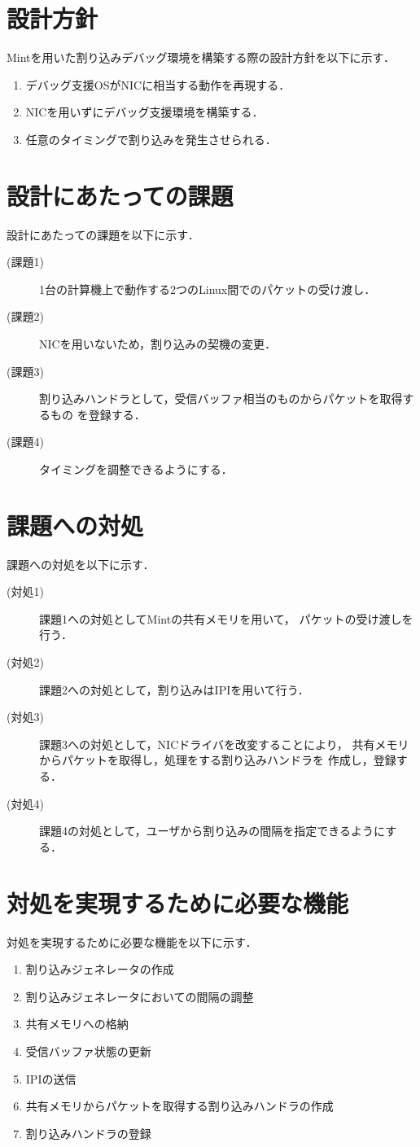\documentclass[tanilab-enum]{graduate}
\begin{document}
\section{設計方針}
Mintを用いた割り込みデバッグ環境を構築する際の設計方針を以下に示す．
\begin{enumerate}
    \item デバッグ支援OSがNICに相当する動作を再現する．
    \item NICを用いずにデバッグ支援環境を構築する．
    \item 任意のタイミングで割り込みを発生させられる．
\end{enumerate}
\section{設計にあたっての課題}
設計にあたっての課題を以下に示す．
\begin{description}
    \item[(課題1)] 1台の計算機上で動作する2つのLinux間でのパケットの受け渡し．
    \item[(課題2)] NICを用いないため，割り込みの契機の変更．
    \item[(課題3)] 割り込みハンドラとして，受信バッファ相当のものからパケットを取得するもの
        を登録する．
    \item[(課題4)] タイミングを調整できるようにする．
\end{description}

\section{課題への対処}
課題への対処を以下に示す．
\begin{description}
    \item[(対処1)]課題1への対処としてMintの共有メモリを用いて，
        パケットの受け渡しを行う．
    \item[(対処2)]課題2への対処として，割り込みはIPIを用いて行う．
    \item[(対処3)]課題3への対処として，NICドライバを改変することにより，
        共有メモリからパケットを取得し，処理をする割り込みハンドラを
        作成し，登録する．
    \item[(対処4)]課題4の対処として，ユーザから割り込みの間隔を指定できるようにする．
\end{description}
\section{対処を実現するために必要な機能}
対処を実現するために必要な機能を以下に示す．
\begin{enumerate}
    \item 割り込みジェネレータの作成
    \item 割り込みジェネレータにおいての間隔の調整
    \item 共有メモリへの格納
    \item 受信バッファ状態の更新
    \item IPIの送信
    \item 共有メモリからパケットを取得する割り込みハンドラの作成
    \item 割り込みハンドラの登録
\end{enumerate}
\end{document}
